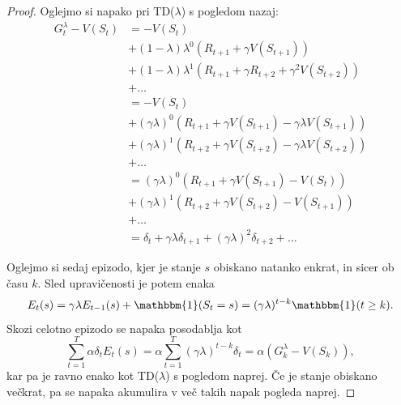 \documentclass[12pt,a4paper]{amsart}
\theoremstyle{definition} %
\theoremstyle{plain} %
\begin{document}
\begin{proof} 
    Oglejmo si napako pri TD($\lambda$) s pogledom nazaj:
    \begin{align*}
    G_t^\lambda - V(S_t) &= - V(S_t) \\
                         &+ (1 - \lambda) \lambda^0 (R_{t+1} + \gamma V(S_{t+1})) \\
                         &+ (1 - \lambda) \lambda^1 (R_{t+1} + \gamma R_{t+2} + 
                                \gamma^2 V(S_{t+2})) \\
                         &+ \dots \\
                         &= - V(S_t) \\
                         &+ (\gamma \lambda)^0 (R_{t+1} + \gamma V(S_{t+1}) - 
                                \gamma \lambda V(S_{t+1})) \\
                         &+ (\gamma \lambda)^1 (R_{t+2} + \gamma V(S_{t+2}) - 
                                \gamma \lambda V(S_{t+2})) \\
                         &+ \dots \\
                         &= (\gamma \lambda)^0 (R_{t+1} + \gamma V(S_{t+1}) - V(S_t)) \\
                         &+ (\gamma \lambda)^1 (R_{t+2} + \gamma V(S_{t+2}) - V(S_{t+1})) \\
                         &+ \dots \\
                         &= \delta_t + \gamma \lambda \delta_{t+1} + 
                                (\gamma \lambda)^2 \delta_{t+2} + \dots
    \end{align*}

    Oglejmo si sedaj epizodo, kjer je stanje $s$ obiskano natanko enkrat, in sicer ob času $k$. 
    Sled upravičenosti je potem enaka 
    $$
    E_t(s) = \gamma \lambda E_{t-1}(s) + \mathbbm{1}(S_t = s) = (\gamma \lambda)^{t-k} 
    \mathbbm{1}(t \geq k).
    $$
    Skozi celotno epizodo se napaka posodablja kot 
    $$
    \sum_{t=1}^T \alpha \delta_t E_t(s) = \alpha \sum_{t=1}^T (\gamma \lambda)^{t-k} \delta_t =
    \alpha (G_k^\lambda - V(S_k)),
    $$
    kar pa je ravno enako kot TD($\lambda$) s pogledom naprej. Če je stanje obiskano večkrat, pa
    se napaka akumulira v več takih napak pogleda naprej.
\end{proof}
\end{document}
